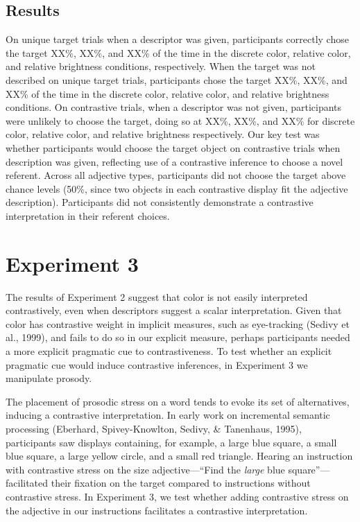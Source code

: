 \documentclass[10pt, letterpaper]{article}
\begin{document}
\subsection{Results}\label{results-1}

On unique target trials when a descriptor was given, participants
correctly chose the target XX\%, XX\%, and XX\% of the time in the
discrete color, relative color, and relative brightness conditions,
respectively. When the target was not described on unique target trials,
participants chose the target XX\%, XX\%, and XX\% of the time in the
discrete color, relative color, and relative brightness conditions. On
contrastive trials, when a descriptor was not given, participants were
unlikely to choose the target, doing so at XX\%, XX\%, and XX\% for
discrete color, relative color, and relative brightness respectively.
Our key test was whether participants would choose the target object on
contrastive trials when description was given, reflecting use of a
contrastive inference to choose a novel referent. Across all adjective
types, participants did not choose the target above chance levels (50\%,
since two objects in each contrastive display fit the adjective
description). Participants did not consistently demonstrate a
contrastive interpretation in their referent choices.

\section{Experiment 3}\label{experiment-3}

The results of Experiment 2 suggest that color is not easily interpreted
contrastively, even when descriptors suggest a scalar interpretation.
Given that color has contrastive weight in implicit measures, such as
eye-tracking (Sedivy et al., 1999), and fails to do so in our explicit
measure, perhaps participants needed a more explicit pragmatic cue to
contrastiveness. To test whether an explicit pragmatic cue would induce
contrastive inferences, in Experiment 3 we manipulate prosody.

The placement of prosodic stress on a word tends to evoke its set of
alternatives, inducing a contrastive interpretation. In early work on
incremental semantic processing (Eberhard, Spivey-Knowlton, Sedivy, \&
Tanenhaus, 1995), participants saw displays containing, for example, a
large blue square, a small blue square, a large yellow circle, and a
small red triangle. Hearing an instruction with contrastive stress on
the size adjective---``Find the \emph{large} blue square''---facilitated
their fixation on the target compared to instructions without
contrastive stress. In Experiment 3, we test whether adding contrastive
stress on the adjective in our instructions facilitates a contrastive
interpretation.
\end{document}

